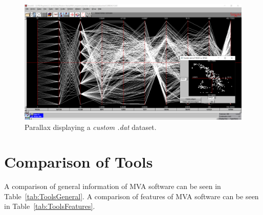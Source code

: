 \begin{figure}[tp]
\centering
\includegraphics[keepaspectratio,width=\linewidth,height=\halfh]
{images/screenshot-parallax.png}

\caption[Parallax]
{%
Parallax displaying a \emph{custom .dat} dataset.
}
\label{fig:ScreenshotParallax}
\end{figure}




\section{Comparison of Tools}

A comparison of general information of MVA software can be seen in
Table~\ref{tab:ToolsGeneral}. A comparison of features of MVA software can
be seen in Table~\ref{tab:ToolsFeatures}.




